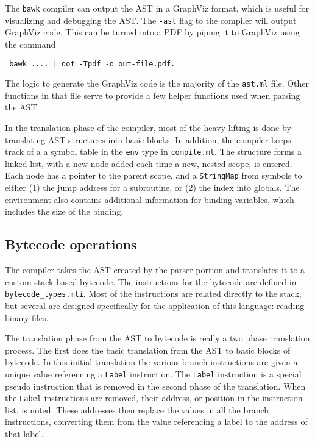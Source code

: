 The \texttt{bawk} compiler can output the AST in a GraphViz format, which is useful for visualizing and debugging the AST.  The \texttt{-ast} flag to the compiler will output GraphViz code.  This can be turned into a PDF by piping it to GraphViz using the command
\begin{center}\tt
bawk .... | dot -Tpdf -o out-file.pdf\rm.
\end{center}
The logic to generate the GraphViz code is the majority of the \texttt{ast.ml} file.  Other functions in that file serve to provide a few helper functions used when parsing the AST.

\bigskip
In the translation phase of the compiler, most of the heavy lifting is done by translating AST structures into basic blocks.  In addition, the compiler keeps track of a a symbol table in the \texttt{env} type in \texttt{compile.ml}.  The structure forms a linked list, with a new node added each time a new, nested scope, is entered.  Each node has a pointer to the parent scope, and a \texttt{StringMap} from symbols to either (1) the jump address for a subroutine, or (2) the index into globals.  The environment also contains additional information for binding variables, which includes the size of the binding.

\subsection{Bytecode operations}
The compiler takes the AST created by the parser portion and translates it to a custom stack-based bytecode.  The instructions for the bytecode are defined in \texttt{bytecode\_types.mli}.  Most of the instructions are related directly to the stack, but several are designed specifically for the application of this language: reading binary files.

The translation phase from the AST to bytecode is really a two phase translation process.  The first does the basic translation from the AST to basic blocks of bytecode.  In this initial translation the various branch instructions are given a unique value referencing a \texttt{Label} instruction.  The \texttt{Label} instruction is a special pseudo instruction that is removed in the second phase of the translation.  When the \texttt{Label} instructions are removed, their address, or position in the instruction list, is noted.  These addresses then replace the values in all the branch instructions, converting them from the value referencing a label to the address of that label.

